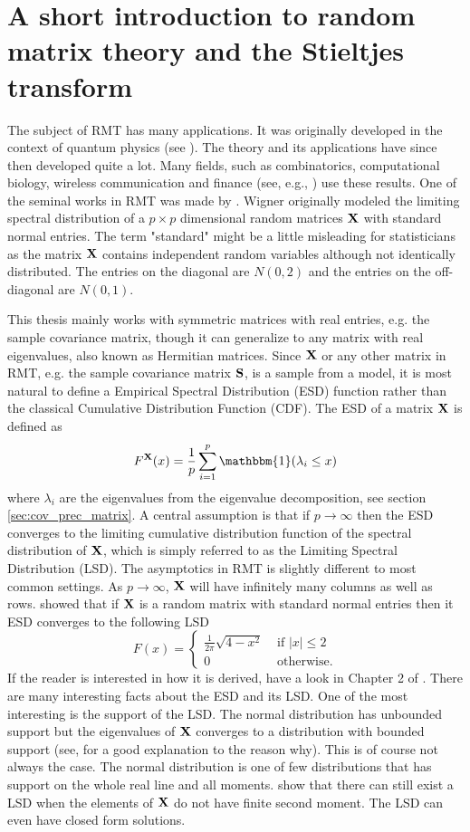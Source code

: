 \documentclass[12pt, oneside]{book}\usepackage{knitr}
\begin{document}
\section{A short introduction to random matrix theory and the Stieltjes transform}
The subject of RMT has many applications.
It was originally developed in the context of quantum physics (see \citet[Chapter 1 of]{mehta2004random}).
The theory and its applications have since then developed quite a lot.
Many fields, such as combinatorics, computational biology, wireless communication and finance (see, e.g., \citet{livan2018introduction}) use these results.
One of the seminal works in RMT was made by \citet{wigner1967random}. 
Wigner originally modeled the limiting spectral distribution of a $p \times p$ dimensional random matrices $\mathbf{X}$ with standard normal entries.
The term "standard" might be a little misleading for statisticians as the matrix $\mathbf{X}$ contains independent random variables although not identically distributed.
The entries on the diagonal are $N(0,2)$ and the entries on the off-diagonal are $N(0,1)$.

This thesis mainly works with symmetric matrices with real entries, e.g. the sample covariance matrix, though it can generalize to any matrix with real eigenvalues, also known as Hermitian matrices.
Since $\mathbf{X}$ or any other matrix in RMT, e.g. the sample covariance matrix $\mathbf{S}$, is a sample from a model, it is most natural to define a Empirical Spectral Distribution (ESD) function rather than the classical Cumulative Distribution Function (CDF).
The ESD of a matrix $\mathbf{X}$ is defined as
$$
F^{\bX}(x)= \frac{1}{p} \sum_{i=1}^p \mathbbm{1}(\lambda_i \leq x)
$$ 
where $\lambda_i$ are the eigenvalues from the eigenvalue decomposition, see section \ref{sec:cov_prec_matrix}.
A central assumption is that if $p \rightarrow \infty$ then the ESD converges to the limiting cumulative distribution function of the spectral distribution of $\mathbf{X}$, which is simply referred to as the Limiting Spectral Distribution (LSD).
The asymptotics in RMT is slightly different to most common settings.
As $p \rightarrow \infty$, $\mathbf{X}$ will have infinitely many columns as well as rows.
\citet{wigner1967random} showed that if $\mathbf{X}$ is a random matrix with standard normal entries then it ESD converges to the following LSD 
$$
F(x) = \begin{cases}
\frac{1}{2\pi} \sqrt{4-x^2} & \text{ if } |x|\leq 2 \\
0 & \text{ otherwise.}
\end{cases}
$$
If the reader is interested in how it is derived, have a look in Chapter 2 of \citet{bai2010spectral}.
There are many interesting facts about the ESD and its LSD. 
One of the most interesting is the support of the LSD.
The normal distribution has unbounded support but the eigenvalues of $\mathbf{X}$ converges to a distribution with bounded support (see, \citet{livan2018introduction} for a good explanation to the reason why).
This is of course not always the case.
The normal distribution is one of few distributions that has support on the whole real line and all moments.
\citet{burda2002free} show that there can still exist a LSD when the elements of $\mathbf{X}$ do not have finite second moment.
The LSD can even have closed form solutions.
\end{document}
